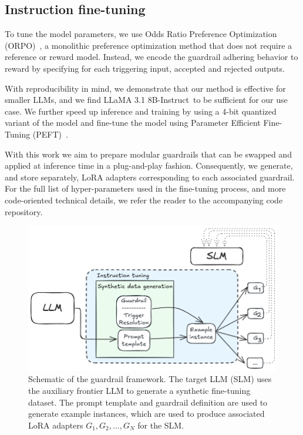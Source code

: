 \documentclass[letterpaper]{article}
\newcommand{\slmm}{LLaMA 3.1 8B-Instruct}
\begin{document}
\subsection{Instruction fine-tuning}
To tune the model parameters, we use Odds Ratio Preference Optimization (ORPO)~\cite{hong2024orpo}, a monolithic preference optimization method that does not require a reference or reward model. Instead, we encode the guardrail adhering behavior to reward by specifying for each triggering input, accepted and rejected outputs.

With reproducibility in mind, we demonstrate that our method is effective for smaller LLMs, and we find \slmm~to be sufficient for our use case. We further speed up inference and training by using a 4-bit quantized variant of the model and fine-tune the model using Parameter Efficient Fine-Tuning (PEFT)~\cite{unsloth, hu2021lora}. 

With this work we aim to prepare modular guardrails that can be swapped and applied at inference time in a plug-and-play fashion. 
Consequently, we generate, and store separately, LoRA adapters corresponding to each associated guardrail. For the full list of hyper-parameters used in the fine-tuning process, and more code-oriented technical details, we refer the reader to the accompanying code repository.
\begin{figure}[!ht]
	\centering
	\includegraphics[width=1.0\linewidth]{figures/datagenSchematic.png}
	\caption{Schematic of the guardrail framework. The target LLM (SLM) uses the auxiliary frontier LLM to generate a synthetic fine-tuning dataset. 
		The prompt template and guardrail definition are used to generate example instances, which are used to produce associated LoRA adapters $G_1, G_2, \ldots, G_N$ for the SLM.}\label{fig:method-schematic-label}
\end{figure} 
\end{document}
